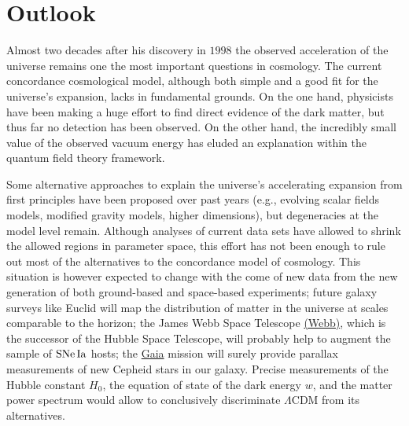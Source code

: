 \chapter{Outlook}
\label{chapter-outlook}

Almost two decades after his discovery in $1998$ the observed acceleration of the universe remains one the most important questions in cosmology. The current concordance cosmological model, although both simple and a good fit for the universe's expansion, lacks in fundamental grounds. On the one hand, physicists have been making a huge effort to find direct evidence of the dark matter, but thus far no detection has been observed. On the other hand, the incredibly small value of the observed vacuum energy has eluded an explanation within the quantum field theory framework. 

Some alternative approaches to explain the universe's accelerating expansion from first principles have been proposed over past years (e.g., evolving scalar fields models, modified gravity models, higher dimensions), but degeneracies at the model level remain. Although analyses of current data sets have allowed to shrink the allowed regions in parameter space, this effort has not been enough to rule out most of the alternatives to the concordance model of cosmology. This situation is however expected to change with the come of new data from the new generation of both ground-based and space-based experiments; future galaxy surveys like Euclid will map the distribution of matter in the universe at scales comparable to the horizon; the James Webb Space Telescope \href{www.jwst.nasa.gov}{(Webb)}, which is the successor of the Hubble Space Telescope, will probably help to augment the sample of $\mathrm{SNe\,Ia}$ hosts; the \href{http://sci.esa.int/gaia/}{Gaia} mission will surely provide parallax measurements of new Cepheid stars in our galaxy. Precise measurements of the Hubble constant $H_0$, the equation of state of the dark energy $w$, and the matter power spectrum would allow to conclusively discriminate $\Lambda$CDM from its alternatives. 


